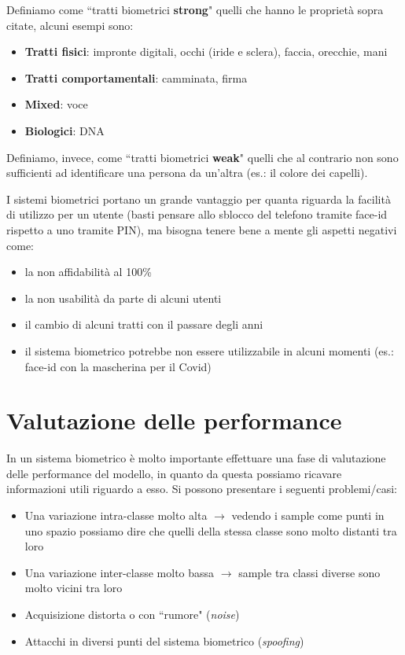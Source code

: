 \documentclass{article}
\begin{document}
Definiamo come ``tratti biometrici \textbf{strong}" quelli che hanno le proprietà sopra citate, alcuni esempi sono: 
\begin{itemize}
    \item \textbf{Tratti fisici}: impronte digitali, occhi (iride e sclera), faccia, orecchie, mani
    \item \textbf{Tratti comportamentali}: camminata, firma
    \item \textbf{Mixed}: voce
    \item \textbf{Biologici}: DNA
\end{itemize}

Definiamo, invece, come ``tratti biometrici \textbf{weak}" quelli che al contrario non sono sufficienti ad identificare una persona da un'altra (es.: il colore dei capelli).

\bigskip
I sistemi biometrici portano un grande vantaggio per quanta riguarda la facilità di utilizzo per un utente (basti pensare allo sblocco del telefono tramite face-id rispetto a uno tramite PIN), ma bisogna tenere bene a mente gli aspetti negativi come: 
\begin{itemize}
    \item la non affidabilità al 100\%
    \item la non usabilità da parte di alcuni utenti
    \item il cambio di alcuni tratti con il passare degli anni
    \item il sistema biometrico potrebbe non essere utilizzabile in alcuni momenti (es.: face-id con la mascherina per il Covid)
\end{itemize}

\section{Valutazione delle performance}
In un sistema biometrico è molto importante effettuare una fase di valutazione delle performance del modello, in quanto da questa possiamo ricavare informazioni utili riguardo a esso. Si possono presentare i seguenti problemi/casi:
\begin{itemize}
    \item Una variazione intra-classe molto alta $\rightarrow$ vedendo i sample come punti in uno spazio possiamo dire che quelli della stessa classe sono molto distanti tra loro
    \item Una variazione inter-classe molto bassa $\rightarrow$ sample tra classi diverse sono molto vicini tra loro
    \item Acquisizione distorta o con ``rumore" (\textit{noise})
    \item Attacchi in diversi punti del sistema biometrico (\textit{spoofing})
\end{itemize}
\end{document}
